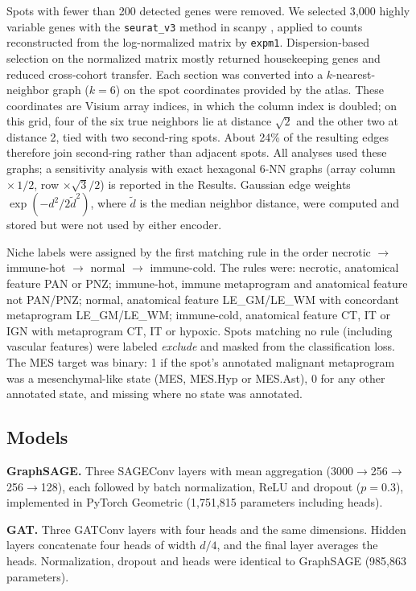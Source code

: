 \documentclass[11pt,letterpaper]{article}
\begin{document}
Spots with fewer than 200 detected genes were removed. We selected 3{,}000 highly variable genes with the \texttt{seurat\_v3} method \cite{stuart2019} in scanpy \cite{wolf2018}, applied to counts reconstructed from the log-normalized matrix by \texttt{expm1}. Dispersion-based selection on the normalized matrix mostly returned housekeeping genes and reduced cross-cohort transfer. Each section was converted into a $k$-nearest-neighbor graph ($k = 6$) on the spot coordinates provided by the atlas. These coordinates are Visium array indices, in which the column index is doubled; on this grid, four of the six true neighbors lie at distance $\sqrt{2}$ and the other two at distance 2, tied with two second-ring spots. About 24\% of the resulting edges therefore join second-ring rather than adjacent spots. All analyses used these graphs; a sensitivity analysis with exact hexagonal 6-NN graphs (array column $\times\,1/2$, row $\times \sqrt{3}/2$) is reported in the Results. Gaussian edge weights $\exp(-d^2 / 2\tilde{d}^2)$, where $\tilde{d}$ is the median neighbor distance, were computed and stored but were not used by either encoder.

Niche labels were assigned by the first matching rule in the order necrotic $\rightarrow$ immune-hot $\rightarrow$ normal $\rightarrow$ immune-cold. The rules were: necrotic, anatomical feature PAN or PNZ; immune-hot, immune metaprogram and anatomical feature not PAN/PNZ; normal, anatomical feature LE\_GM/LE\_WM with concordant metaprogram LE\_GM/LE\_WM; immune-cold, anatomical feature CT, IT or IGN with metaprogram CT, IT or hypoxic. Spots matching no rule (including vascular features) were labeled \emph{exclude} and masked from the classification loss. The MES target was binary: 1 if the spot's annotated malignant metaprogram was a mesenchymal-like state (MES, MES.Hyp or MES.Ast), 0 for any other annotated state, and missing where no state was annotated.

\subsection{Models}

\textbf{GraphSAGE.} Three SAGEConv layers \cite{hamilton2017} with mean aggregation (3000$\rightarrow$256$\rightarrow$256$\rightarrow$128), each followed by batch normalization, ReLU and dropout ($p = 0.3$), implemented in PyTorch Geometric \cite{fey2019} (1{,}751{,}815 parameters including heads).

\textbf{GAT.} Three GATConv layers \cite{velickovic2018} with four heads and the same dimensions. Hidden layers concatenate four heads of width $d/4$, and the final layer averages the heads. Normalization, dropout and heads were identical to GraphSAGE (985{,}863 parameters).
\end{document}
